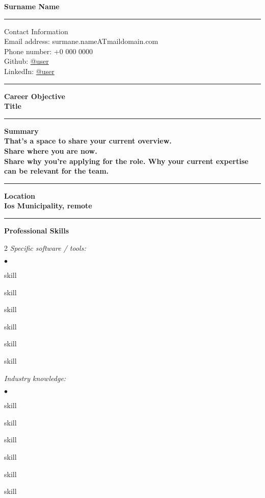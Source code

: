 \documentclass[oneside,final,12pt]{extreport}
\newenvironment{compactlist}{
	\begin{list}{{$\bullet$}}{
		\setlength\leftmargin{0.4cm}
		\setlength\partopsep{0pt}
		\setlength\parskip{0pt}
		\setlength\parsep{0pt}
		\setlength\topsep{0pt}
		\setlength\itemsep{0pt}
	}
}{
	\end{list}
}
\begin{document}
\bfseries
Surname Name \\
\rule{\textwidth}{0.4pt}
Contact Information \\
\noindent
\mdseries
Email address: 
surmane.nameATmaildomain.com \\
Phone number: 
+0 000 0000 \\
Github:
\href{https://github.com/user}{@user} \\
LinkedIn:
\href{https://www.linkedin.com/in/username}{@user} \\
\rule{\textwidth}{0.4pt}

\bfseries
Career Objective \\
\mdseries
Title \\
\rule{\textwidth}{0.4pt}

\bfseries
Summary \\
\mdseries
That's a space to share your current overview. \\
Share where you are now. \\[5pt]
Share why you're applying for the role. Why your current expertise can be relevant for the team. \\
\rule{\textwidth}{0.4pt}

\bfseries
Location \\
\mdseries
Ios Municipality, remote \\
\rule{\textwidth}{0.4pt}

\bfseries
Professional Skills
\mdseries
\begin{multicols}{2}
\textsl{Specific software / tools:}
	\begin{compactlist}
		\item skill
		\item skill
		\item skill
		\item skill
		\item skill
		\item skill
	\end{compactlist}
\textsl{Industry knowledge:}
	\begin{compactlist}
		\item skill
		\item skill
		\item skill
		\item skill
		\item skill
		\item skill
	\end{compactlist}
\end{multicols}
\end{document}
